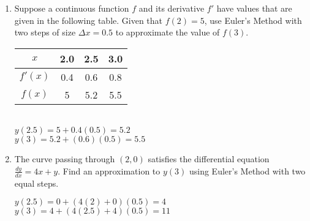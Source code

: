 \documentclass[10pt,letterpaper]{report}
\begin{document}
\begin{enumerate}
\begin{enumerate}
    \end{enumerate}
    
    \hline
    
  \item{Suppose a continuous function $f$ and its derivative $f'$ have values that are given in the following table. Given that $f(2)=5$, use Euler's Method with two steps of size $\Delta x=0.5$ to approximate the value of $f(3)$. }
  \begin{multicols}{2}
    \begin{center}
      \begin{tabular}{| c | c | c | c |}
        \hline
        $x$ & 2.0 & 2.5 & 3.0 \\
        \hline
        $f'(x)$ & 0.4 & 0.6 & 0.8 \\
        \hline
        $f(x)$ & 5 & 5.2 & 5.5 \\
        \hline
      \end{tabular}
    \end{center} \\
    $y(2.5)=5+0.4(0.5)=5.2$ \\
  
    $y(3)=5.2+(0.6)(0.5)=5.5$ \\
  \end{multicols}

  \pagebreak
  
  \item{The curve passing through $(2,0)$ satisfies the differential equation $\frac{dy}{dx}=4x+y$. Find an approximation to $y(3)$ using Euler's Method with two equal steps. \\}
  
    $y(2.5)=0+(4(2)+0)(0.5)=4$ \\
    
    $y(3)=4+(4(2.5)+4)(0.5)=11$ \\
    
    \hline
    

\end{enumerate}
\end{document}
